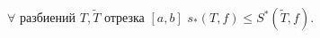\label{don1}
 	$\forall$ разбиений  $T,\widetilde T$ отрезка $[a,b]$\pau
 	$s_*(T,f)\leq S^*(\widetilde T,f).$
 